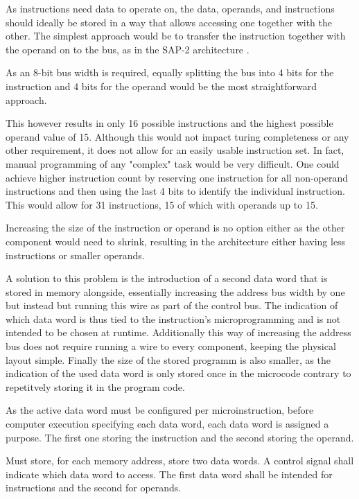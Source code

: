 As instructions need data to operate on, the data, operands, and instructions should ideally be stored in a way that allows accessing one together with the other. The simplest approach would be to transfer the instruction together with the operand on to the bus, as in the SAP-2 architecture \cite{malvino1983a}.

As an 8-bit bus width is required, equally splitting the bus into 4 bits for the instruction and 4 bits for the operand would be the most straightforward approach.

This however results in only 16 possible instructions and the highest possible operand value of 15. Although this would not impact turing completeness or any other requirement, it does not allow for an easily usable instruction set. In fact, manual programming of any "complex" task would be very difficult. One could achieve higher instruction count by reserving one instruction for all non-operand instructions and then using the last 4 bits to identify the individual instruction. This would allow for 31 instructions, 15 of which with operands up to 15.

Increasing the size of the instruction or operand is no option either as the other component would need to shrink, resulting in the architecture either having less instructions or smaller operands.

A solution to this problem is the introduction of a second data word that is stored in memory alongside, essentially increasing the address bus width by one but instead but running this wire as part of the control bus. The indication of which data word is thus tied to the instruction's microprogramming and is not intended to be chosen at runtime. Additionally this way of increasing the address bus does not require running a wire to every component, keeping the physical layout simple. Finally the size of the stored programm is also smaller, as the indication of the used data word is only stored once in the microcode contrary to repetitvely storing it in the program code.  

As the active data word must be configured per microinstruction, before computer execution specifying each data word, each data word is assigned a purpose. The first one storing the instruction and the second storing the operand.    

\begin{feat-requirement}
Must store, for each memory address, store two data words. A control signal shall indicate which data word to access. The first data word shall be intended for instructions and the second for operands.
\end{feat-requirement}


